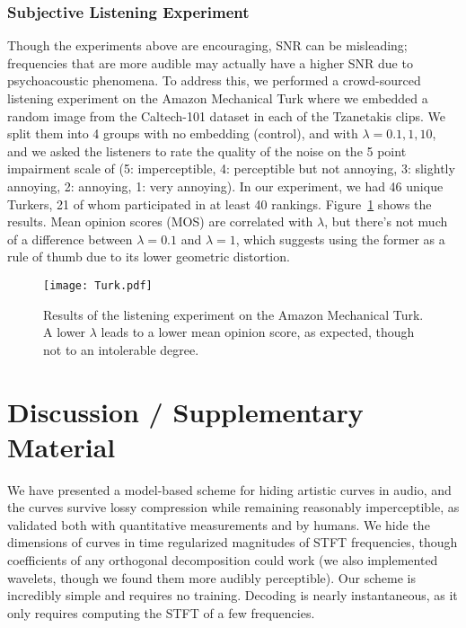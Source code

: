 \documentclass[runningheads]{llncs}
\begin{document}
\subsubsection{Subjective Listening Experiment}


Though the experiments above are encouraging, SNR can be misleading; frequencies that are more audible may actually have a higher SNR due to psychoacoustic phenomena.  To address this, we performed a crowd-sourced listening experiment on the Amazon Mechanical Turk where we embedded a random image from the Caltech-101 dataset in each of the Tzanetakis clips.  We split them into 4 groups with no embedding (control), and with $\lambda = 0.1, 1, 10$, and we asked the listeners to rate the quality of the noise on the 5 point impairment scale of \cite{bassia2001robust} (5: imperceptible, 4: perceptible but not annoying, 3: slightly annoying, 2: annoying, 1: very annoying).  In our experiment, we had 46 unique Turkers, 21 of whom participated in at least 40 rankings.  Figure~\ref{fig:TurkResults} shows the results.  Mean opinion scores (MOS) are correlated with $\lambda$, but there's not much of a difference between $\lambda=0.1$ and $\lambda=1$, which suggests using the former as a rule of thumb due to its lower geometric distortion.




\begin{figure}
  \begin{minipage}[c]{0.36\textwidth}
    \caption{
      Results of the listening experiment on the Amazon Mechanical Turk.  A lower $\lambda$ leads to a lower mean opinion score, as expected, though not to an intolerable degree.
    } \label{fig:TurkResults}
  \end{minipage}
  \begin{minipage}[c]{0.64\textwidth}
    \texttt{[image: Turk.pdf]}
  \end{minipage}\hfill
  
\end{figure}

\section{Discussion / Supplementary Material}

We have presented a model-based scheme for hiding artistic curves in audio, and the curves survive lossy compression while remaining reasonably imperceptible, as validated both with quantitative measurements and by humans.  We hide the dimensions of curves in time regularized magnitudes of STFT frequencies, though coefficients of any orthogonal decomposition could work (we also implemented wavelets, though we found them more audibly perceptible).  Our scheme is incredibly simple and requires no training.  Decoding is nearly instantaneous, as it only requires computing the STFT of a few frequencies. 
\end{document}
